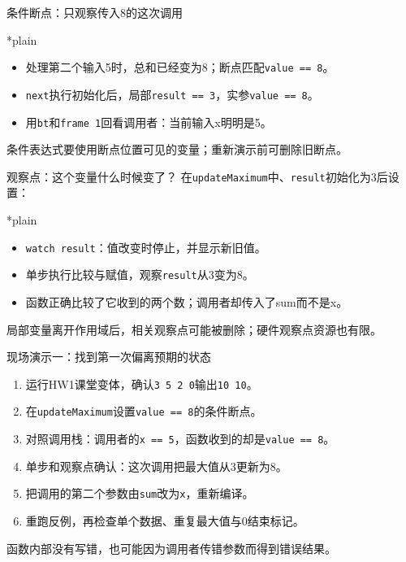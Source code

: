 \begin{frame}{条件断点：只观察传入8的这次调用}
    \begin{Code}*{plain}
        
    \end{Code}
    \begin{itemize}
        \item 处理第二个输入5时，总和已经变为8；断点匹配\texttt{value == 8}。
        \item \texttt{next}执行初始化后，局部\texttt{result == 3}，实参\texttt{value == 8}。
        \item 用\texttt{bt}和\texttt{frame 1}回看调用者：\alert{当前输入x明明是5}。
    \end{itemize}
    \small 条件表达式要使用断点位置可见的变量；重新演示前可删除旧断点。
\end{frame}

\begin{frame}{观察点：这个变量什么时候变了？}
    在\texttt{updateMaximum}中、\texttt{result}初始化为3后设置：
    \begin{Code}*{plain}
        
    \end{Code}
    \begin{itemize}
        \item \texttt{watch result}：值改变时停止，并显示新旧值。
        \item 单步执行比较与赋值，观察\texttt{result}从3变为8。
        \item 函数正确比较了它收到的两个数；\alert{调用者却传入了sum而不是x}。
    \end{itemize}
    \medskip
    \small 局部变量离开作用域后，相关观察点可能被删除；硬件观察点资源也有限。
\end{frame}

\begin{frame}{现场演示一：找到第一次偏离预期的状态}
    \begin{enumerate}
        \item 运行HW1课堂变体，确认\texttt{3 5 2 0}输出\texttt{10 10}。
        \item 在\texttt{updateMaximum}设置\texttt{value == 8}的条件断点。
        \item 对照调用栈：调用者的\texttt{x == 5}，函数收到的却是\texttt{value == 8}。
        \item 单步和观察点确认：这次调用把最大值从3更新为8。
        \item 把调用的第二个参数由\texttt{sum}改为\texttt{x}，重新编译。
        \item 重跑反例，再检查单个数据、重复最大值与0结束标记。
    \end{enumerate}
    \medskip
    \alert{函数内部没有写错，也可能因为调用者传错参数而得到错误结果。}
\end{frame}

